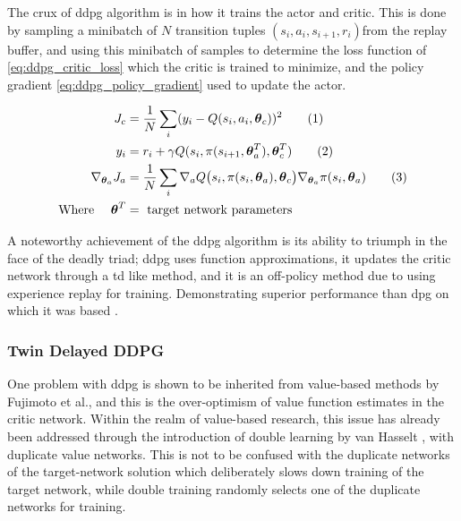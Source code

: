 \documentclass[../report.tex]{subfiles}
\begin{document}
The crux of \ac{ddpg} algorithm is in how it trains the actor and critic. This is done by sampling a minibatch of $N$ transition tuples $(s_i, a_i, s_{i+1}, r_i)$from the replay buffer, and using this minibatch of samples to determine the loss function of \autoref{eq:ddpg_critic_loss} which the critic is trained to minimize, and the policy gradient \autoref{eq:ddpg_policy_gradient} used to update the actor.

{\myfont
\begin{align*}
    J_c &= \frac{1}{N}\sum\limits_i (y_i - Q(s_i, a_i, \boldsymbol{\theta}_c))^2  \stepcounter{equation}\tag{\theequation}\label{eq:ddpg_critic_loss}\\
    y_i &= r_i + \gamma Q(s_i, \pi(s_{i+1}, \boldsymbol{\theta}^T_a), \boldsymbol{\theta}^T_c) \stepcounter{equation}\tag{\theequation}\label{eq:y_i_ddpg}\\
    \nabla_{\boldsymbol{\theta}_a} J_a &= \frac{1}{N}\sum\limits_i \nabla_a Q\big(s_i,\pi(s_i, \boldsymbol{\theta}_a),\boldsymbol{\theta}_c\big) \nabla_{\boldsymbol{\theta}_a} \pi(s_i, \boldsymbol{\theta}_a) \stepcounter{equation}\tag{\theequation}\label{eq:ddpg_policy_gradient} \\
    \text{Where } \quad \boldsymbol{\theta}^T &= \text{ target network parameters}
\end{align*}
}

A noteworthy achievement of the \ac{ddpg} algorithm is its ability to triumph in the face of the deadly triad; \ac{ddpg} uses function approximations, it updates the critic network through a \ac{td} like method, and it is an off-policy method due to using experience replay for training. Demonstrating superior performance than \ac{dpg} on which it was based \cite{ddpg}.


\subsubsection{Twin Delayed DDPG}

One problem with \ac{ddpg} is shown to be inherited from value-based methods by Fujimoto et al., and this is the over-optimism of value function estimates in the critic network. Within the realm of value-based research, this issue has already been addressed through the introduction of double learning by van Hasselt \cite{double_q_learning}, with duplicate value networks. This is not to be confused with the duplicate networks of the target-network solution which deliberately slows down training of the target network, while double training randomly selects one of the duplicate networks for training. 
\end{document}
